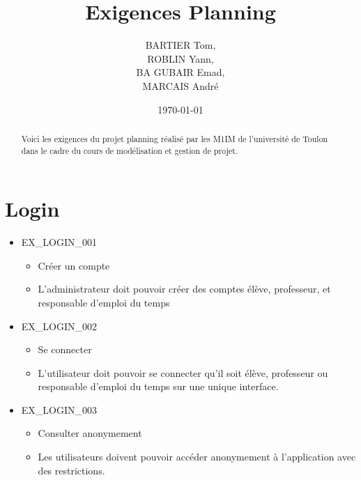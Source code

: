 \documentclass[french]{scrartcl}
\title{Exigences Planning}
\author{BARTIER Tom,\\ ROBLIN Yann,\\ BA GUBAIR Emad,\\ MARCAIS André}
\date{\today}
\begin{document}
\maketitle

\begin{abstract}
Voici les exigences du projet planning réalisé par les M1IM de l'université
de Toulon dans le cadre du cours de modélisation et gestion de projet.
\end{abstract}

\section{Login}
\begin{itemize}
    \item EX\_LOGIN\_001
                \begin{itemize}
                    \item Créer un compte
                    \item L'administrateur doit pouvoir créer des comptes élève, professeur, et responsable d'emploi du temps
                \end{itemize}
    
    \item EX\_LOGIN\_002
        \begin{itemize}
            \item Se connecter
            \item L'utilisateur doit pouvoir se connecter qu'il soit élève, professeur ou responsable d'emploi du temps sur une unique interface.
        \end{itemize}

    \item EX\_LOGIN\_003
        \begin{itemize}
            \item Consulter anonymement
            \item Les utilisateurs doivent pouvoir accéder anonymement à l'application avec des restrictions.
        \end{itemize}
\end{itemize}
\end{document}
